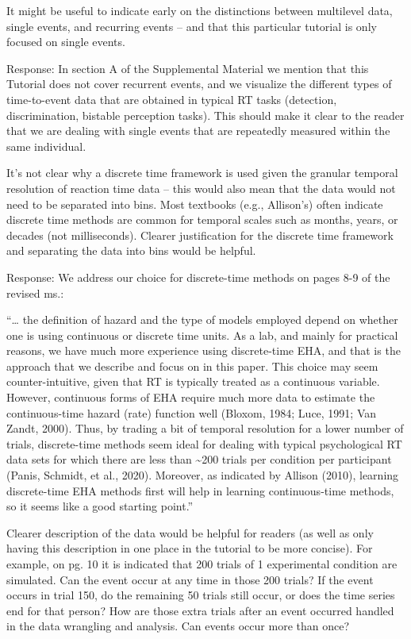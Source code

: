 \documentclass[
]{article}
\renewenvironment{quote}{\begin{leftbar}}{\end{leftbar}}
\begin{document}
\begin{quote}
It might be useful to indicate early on the distinctions between
multilevel data, single events, and recurring events -- and that this
particular tutorial is only focused on single events.
\end{quote}

Response: In section A of the Supplemental Material we mention that this
Tutorial does not cover recurrent events, and we visualize the different
types of time-to-event data that are obtained in typical RT tasks
(detection, discrimination, bistable perception tasks). This should make
it clear to the reader that we are dealing with single events that are
repeatedly measured within the same individual.

\begin{quote}
It's not clear why a discrete time framework is used given the granular
temporal resolution of reaction time data -- this would also mean that
the data would not need to be separated into bins. Most textbooks (e.g.,
Allison's) often indicate discrete time methods are common for temporal
scales such as months, years, or decades (not milliseconds). Clearer
justification for the discrete time framework and separating the data
into bins would be helpful.
\end{quote}

Response: We address our choice for discrete-time methods on pages 8-9
of the revised ms.:

``\ldots{} the definition of hazard and the type of models employed
depend on whether one is using continuous or discrete time units. As a
lab, and mainly for practical reasons, we have much more experience
using discrete-time EHA, and that is the approach that we describe and
focus on in this paper. This choice may seem counter-intuitive, given
that RT is typically treated as a continuous variable. However,
continuous forms of EHA require much more data to estimate the
continuous-time hazard (rate) function well (Bloxom, 1984; Luce, 1991;
Van Zandt, 2000). Thus, by trading a bit of temporal resolution for a
lower number of trials, discrete-time methods seem ideal for dealing
with typical psychological RT data sets for which there are less than
\textasciitilde200 trials per condition per participant (Panis, Schmidt,
et al., 2020). Moreover, as indicated by Allison (2010), learning
discrete-time EHA methods first will help in learning continuous-time
methods, so it seems like a good starting point.''

\begin{quote}
Clearer description of the data would be helpful for readers (as well as
only having this description in one place in the tutorial to be more
concise). For example, on pg. 10 it is indicated that 200 trials of 1
experimental condition are simulated. Can the event occur at any time in
those 200 trials? If the event occurs in trial 150, do the remaining 50
trials still occur, or does the time series end for that person? How are
those extra trials after an event occurred handled in the data wrangling
and analysis. Can events occur more than once?
\end{quote}
\end{document}
